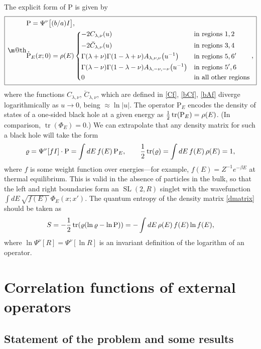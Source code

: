 \documentclass[12pt]{article}
\makeatletter
\newcommand{\be}{\begin{equation}}
\newcommand{\ee}{\end{equation}}
\newcommand*{\wideboxed}[1]{\setlength{\fboxsep}{1ex}%
  \fbox{\m@th$\displaystyle#1$}}
\newcommand{\RR}{\mathbb{R}}
\DeclareMathOperator{\tr}{tr}
\DeclareMathOperator{\tSL}{\widetilde{\mathrm{SL}}}
\newcommand{\bC}{\breve{C}}
\newcommand{\Rho}{\mathrm{P}}
\newcommand{\lam}{\lambda}
\newcommand{\ov}{\over}
\def\widetilde#1{#1}%
\def\RR{R}
\makeatother
\begin{document}
The explicit form of $\Rho$ is given by
\be \label{Rho}
\wideboxed{\begin{aligned}
&\Rho=\Psi^{\nu}\bigl[(b/a)I\bigr],\\
&\mathring{\Rho}_E(x;0)= \rho(E)\begin{dcases}
 -2 C_{\lam, \nu}(u) & \text{in regions $1, 2$}\\
-2  \bC_{\lam, \nu}(u)&  \text{in regions $3, 4$}\\
\Gamma(\lam+\nu)\Gamma(1-\lam+\nu)A_{\lam, \nu, \nu}\bigl(u^{-1}\bigr) & \text{in regions $5, 6'$}\\
\Gamma(\lam-\nu)\Gamma(1-\lam-\nu)A_{\lam, -\nu, -\nu}\bigl(u^{-1}\bigr) & \text{in regions $5', 6$}\\
0 & \text{in all other regions}
\end{dcases},
\end{aligned}}
\ee 
where the functions $C_{\lam, \nu}$, $\bC_{\lam, \nu}$, which are defined in \eqref{Cf}, \eqref{bCf}, \eqref{bAf} diverge logarithmically as $u \to 0$, being $\approx \ln |u|$. The operator $\Rho_E$ encodes the density of states of a one-sided black hole at a given energy as ${1 \ov 2}\tr(\Rho_E)=\rho(E)$. (In comparison, $\tr(\Phi_E)=0$.) We can extrapolate that any density matrix for such a black hole will take the form 
\be \label{dmatrix}
\varrho=\Psi^{\nu}[fI]\cdot\Rho=\int dE\, f(E)\,\Rho_E, \qquad {1 \ov 2}\tr(\varrho)=\int dE\, f(E)\,\rho(E)=1,
\ee
where $f$ is some weight function over energies---for example, $f(E)=Z^{-1}e^{-\beta E}$ at thermal equilibrium. This is valid in the absence of particles in the bulk, so that the left and right boundaries form an $\tSL(2,\RR)$ singlet with the wavefunction $\int dE\,\sqrt{f(E)}\,\Phi_E(x;x')$. The quantum entropy of the density matrix \eqref{dmatrix} should be taken as
\be
S=-{1 \ov 2}\tr(\varrho(\ln \varrho-\ln \Rho))=-\int dE\, \rho(E)\,f(E)\ln f(E),
\ee
where $\ln \Psi^{\nu}[R]=\Psi^{\nu}[\ln R]$ is an invariant definition of the logarithm of an operator.

\section{Correlation functions of external operators}\label{sec:corr}

\subsection{Statement of the problem and some results}\label{sec:corrgen}
\end{document}
